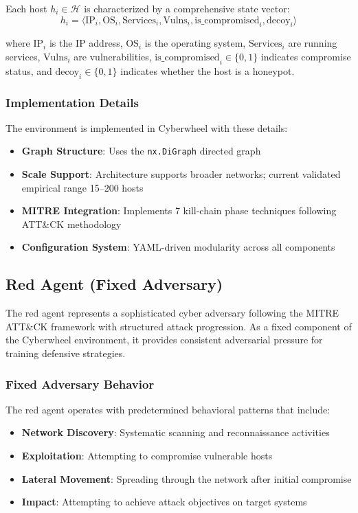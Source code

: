 \documentclass[12pt,oneside]{article}
\begin{document}
Each host $h_i \in \mathcal{H}$ is characterized by a comprehensive state vector:
\begin{equation}
h_i = \langle \text{IP}_i, \text{OS}_i, \text{Services}_i, \text{Vulns}_i, \text{is\_compromised}_i, \text{decoy}_i \rangle
\end{equation}

where $\text{IP}_i$ is the IP address, $\text{OS}_i$ is the operating system, $\text{Services}_i$ are running services, $\text{Vulns}_i$ are vulnerabilities, $\text{is\_compromised}_i \in \{0,1\}$ indicates compromise status, and $\text{decoy}_i \in \{0,1\}$ indicates whether the host is a honeypot.

\subsubsection{Implementation Details}
The environment is implemented in Cyberwheel with these details:
\begin{itemize}
    \item \textbf{Graph Structure}: Uses the \texttt{nx.DiGraph} directed graph
    \item \textbf{Scale Support}: Architecture supports broader networks; current validated empirical range 15--200 hosts
    \item \textbf{MITRE Integration}: Implements 7 kill-chain phase techniques following ATT\&CK methodology
    \item \textbf{Configuration System}: YAML-driven modularity across all components
\end{itemize}


\subsection{Red Agent (Fixed Adversary)}

The red agent represents a sophisticated cyber adversary following the MITRE ATT\&CK framework with structured attack progression. As a fixed component of the Cyberwheel environment, it provides consistent adversarial pressure for training defensive strategies.

\subsubsection{Fixed Adversary Behavior}
The red agent operates with predetermined behavioral patterns that include:
\begin{itemize}
\item \textbf{Network Discovery}: Systematic scanning and reconnaissance activities
\item \textbf{Exploitation}: Attempting to compromise vulnerable hosts
\item \textbf{Lateral Movement}: Spreading through the network after initial compromise
\item \textbf{Impact}: Attempting to achieve attack objectives on target systems
\end{itemize}
\end{document}
